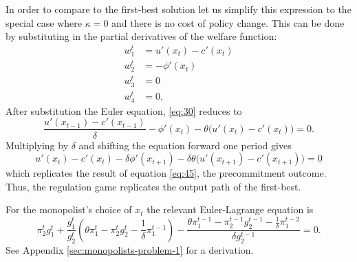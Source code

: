 In order to compare to the first-best solution let us simplify this
expression to the special case where $\kappa=0$ and there is no cost
of policy change. This can be done by substituting in the partial
derivatives of the welfare function:
\begin{align}
  \label{eq:67}
  w^t_1 &= u'(x_t) - c'(x_t) \\ \label{eq:68} w^t_2 &= -\phi'(x_t)
  \\ \label{eq:69} w^t_3 &= 0 \\ \label{eq:70} w^t_4 &= 0.
\end{align}
After substitution the Euler equation, \eqref{eq:30} reduces to
\begin{equation}
  \label{eq:71}
  \frac{u'(x_{t-1}) - c'(x_{t-1})}{\delta} - \phi'(x_t) - \theta \big(
  u'(x_t) - c'(x_t) \big) = 0.
\end{equation}
Multiplying by $\delta$ and shifting the equation forward one period
gives
\begin{equation}
  \label{eq:72}
  u'(x_t) - c'(x_t) - \delta \phi'(x_{t+1}) - \delta\theta \big(
  u'(x_{t+1}) - c'(x_{t+1}) \big) = 0
\end{equation}
which replicates the result of equation \eqref{eq:45}, the
precommitment outcome. Thus, the regulation game replicates the output
path of the first-best.

For the monopolist's choice of $x_t$ the relevant Euler-Lagrange
equation is
\begin{equation}
\label{eq:84}
  \pi^t_2g^t_1 + \frac{g^t_1}{g^t_2} \left( \theta \pi^t_1 -
    \pi^t_2g^t_2 - \frac{1}\delta\pi^{t-1}_1 \right) -
  \frac{\theta\pi^{t-1}_1 - \pi^{t-1}_2g^{t-1}_2 -
    \frac{1}\delta\pi^{t-2}_1}{\delta g^{t-1}_2} = 0.
\end{equation}
See Appendix \ref{sec:monopolists-problem-1} for a derivation.





